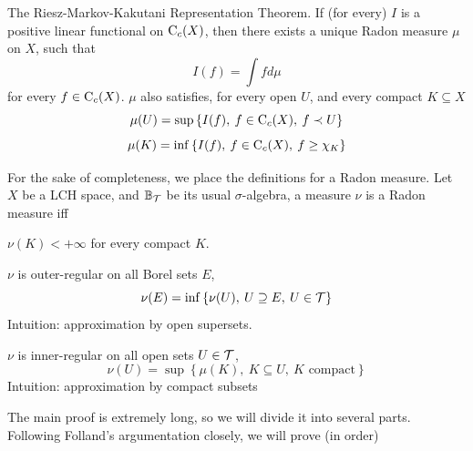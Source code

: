 \documentclass[../../main.tex]{subfiles}
\begin{document}
\graphicspath{{../../images/}{images/}} 

\begin{wts}
    The Riesz-Markov-Kakutani Representation Theorem. If (for every) $I$ is a positive linear functional on $\operatorname{C}_c({X})$, then there exists a unique Radon measure $\mu$ on $X$, such that
    \[
    I(f) = \int fd\mu
    \]
    for every $f\in\operatorname{C}_c({X})$. $\mu$ also satisfies, for every open $U$, and every compact $K\subseteq X$
    \begin{equation}\label{open approximated by If}
        \mu(U) = \sup\left\{I(f),\:f\in\operatorname{C}_c({X}),\:f\prec U\right\}
    \end{equation}
    \begin{equation}\label{compact approximated by If}
        \mu(K)=\inf\left\{I(f),\:f\in\operatorname{C}_c({X}),\:f\geq\chi_K\right\}
    \end{equation}
\end{wts}
\providecommand{\borel}{\mathbb{B}_{\Tau}} %
\providecommand{\mustar}{\mu^*} %
%
For the sake of completeness, we place the definitions for a Radon measure. Let $X$ be a LCH space, and $\borel$ be its usual $\sigma$-algebra, a measure $\nu$ is a Radon measure iff
\begin{enumroman}
    \item $\nu(K)<+\infty$ for every compact $K$.
    \item $\nu$ is outer-regular on all Borel sets $E$,
    \[
    \nu(E) = \inf\left\{\nu(U),\: U\supseteq E,\:U\in\mathcal{T}\right\}
    \]
    Intuition: approximation by open supersets.
    \item $\nu$ is inner-regular on all open sets $U\in\mathcal{T}$,
    \[
    \nu(U) = \sup\left\{\mu(K),\: K\subseteq U,\:K\text{ compact}\right\}
    \]
    Intuition: approximation by compact subsets 
\end{enumroman}
%
%
The main proof is extremely long, so we will divide it into several parts. Following Folland's argumentation closely, we will prove (in order)
%
%
\end{document}

